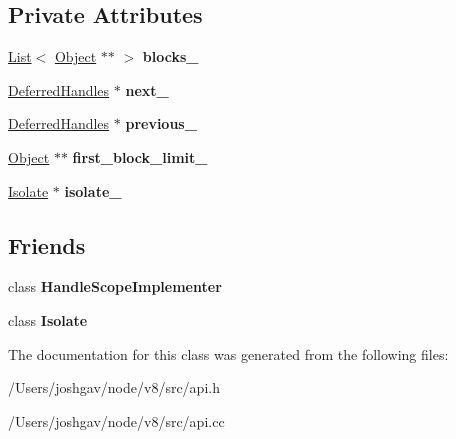 \subsection*{Private Attributes}
\begin{DoxyCompactItemize}
\item 
\hyperlink{classv8_1_1internal_1_1_list}{List}$<$ \hyperlink{classv8_1_1internal_1_1_object}{Object} $\ast$$\ast$ $>$ {\bfseries blocks\+\_\+}\hypertarget{classv8_1_1internal_1_1_deferred_handles_a89156659f28aba4989d62496e65e8944}{}\label{classv8_1_1internal_1_1_deferred_handles_a89156659f28aba4989d62496e65e8944}

\item 
\hyperlink{classv8_1_1internal_1_1_deferred_handles}{Deferred\+Handles} $\ast$ {\bfseries next\+\_\+}\hypertarget{classv8_1_1internal_1_1_deferred_handles_af48a24f31c159cff878c1e5b1c469e07}{}\label{classv8_1_1internal_1_1_deferred_handles_af48a24f31c159cff878c1e5b1c469e07}

\item 
\hyperlink{classv8_1_1internal_1_1_deferred_handles}{Deferred\+Handles} $\ast$ {\bfseries previous\+\_\+}\hypertarget{classv8_1_1internal_1_1_deferred_handles_a5387f52fbc61053eca5c70b8a01e28fd}{}\label{classv8_1_1internal_1_1_deferred_handles_a5387f52fbc61053eca5c70b8a01e28fd}

\item 
\hyperlink{classv8_1_1internal_1_1_object}{Object} $\ast$$\ast$ {\bfseries first\+\_\+block\+\_\+limit\+\_\+}\hypertarget{classv8_1_1internal_1_1_deferred_handles_ab3e3a21df8f3fa4e1b1ae41f4086fd8b}{}\label{classv8_1_1internal_1_1_deferred_handles_ab3e3a21df8f3fa4e1b1ae41f4086fd8b}

\item 
\hyperlink{classv8_1_1internal_1_1_isolate}{Isolate} $\ast$ {\bfseries isolate\+\_\+}\hypertarget{classv8_1_1internal_1_1_deferred_handles_ada25b22e973898c722f4eb5c8019fa35}{}\label{classv8_1_1internal_1_1_deferred_handles_ada25b22e973898c722f4eb5c8019fa35}

\end{DoxyCompactItemize}
\subsection*{Friends}
\begin{DoxyCompactItemize}
\item 
class {\bfseries Handle\+Scope\+Implementer}\hypertarget{classv8_1_1internal_1_1_deferred_handles_a4212b6d1addb496cb92d67a2e399a1f3}{}\label{classv8_1_1internal_1_1_deferred_handles_a4212b6d1addb496cb92d67a2e399a1f3}

\item 
class {\bfseries Isolate}\hypertarget{classv8_1_1internal_1_1_deferred_handles_aba4f0964bdacf2bbf62cf876e5d28d0a}{}\label{classv8_1_1internal_1_1_deferred_handles_aba4f0964bdacf2bbf62cf876e5d28d0a}

\end{DoxyCompactItemize}


The documentation for this class was generated from the following files\+:\begin{DoxyCompactItemize}
\item 
/\+Users/joshgav/node/v8/src/api.\+h\item 
/\+Users/joshgav/node/v8/src/api.\+cc\end{DoxyCompactItemize}
